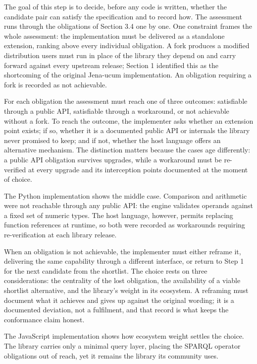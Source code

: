 The goal of this step is to decide, before any code is written, whether the candidate pair can satisfy the specification and to record how. The assessment runs through the obligations of Section 3.4 one by one.
One constraint frames the whole assessment: the implementation must be delivered as a standalone extension, ranking above every individual obligation. A fork produces a modified distribution users must run in place of the library they depend on and carry forward against every upstream release; Section 1 identified this as the shortcoming of the original Jena-ucum implementation. An obligation requiring a fork is recorded as not achievable.


For each obligation the assessment must reach one of three outcomes: satisfiable through a public API, satisfiable through a workaround, or not achievable without a fork. To reach the outcome, the implementer asks whether an extension point exists; if so, whether it is a documented public API or internals the library never promised to keep; and if not, whether the host language offers an alternative mechanism. The distinction matters because the cases age differently: a public API obligation survives upgrades, while a workaround must be re-verified at every upgrade and its interception points documented at the moment of choice.

The Python implementation shows the middle case. Comparison and arithmetic were not reachable through any public API: the engine validates operands against a fixed set of numeric types. The host language, however, permits replacing function references at runtime, so both were recorded as workarounds requiring re-verification at each library release.

When an obligation is not achievable, the implementer must either reframe it, delivering the same capability through a different interface, or return to Step 1 for the next candidate from the shortlist. The choice rests on three considerations: the centrality of the lost obligation, the availability of a viable shortlist alternative, and the library's weight in its ecosystem. A reframing must document what it achieves and gives up against the original wording; it is a documented deviation, not a fulfilment, and that record is what keeps the conformance claim honest.

The JavaScript implementation shows how ecosystem weight settles the choice. The library carries only a minimal query layer, placing the SPARQL operator obligations out of reach, yet it remains the library its community uses. 

